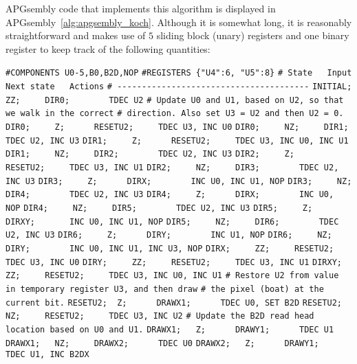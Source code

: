 APGsembly code that implements this algorithm is displayed in APGsembly~\ref{alg:apgsembly_koch}. Although it is somewhat long, it is reasonably straightforward and makes use of $5$ sliding block (unary) registers and one binary register to keep track of the following quantities:\medskip

\begin{apgsembly}
	\centering
	\begin{minipage}[t]{.49\textwidth}
		\begin{algorithmic}\tiny
			\State \verb|#COMPONENTS U0-5,B0,B2D,NOP|
			\State \verb|#REGISTERS {"U4":6, "U5":8}|
			\State \verb|# State   Input   Next state   Actions|
			\State \verb|# ---------------------------------------|
			\State \verb|INITIAL;  ZZ;     DIR0;        TDEC U2|
			\State
			\State \verb|# Update U0 and U1, based on U2, so that we walk in the correct|
			\State \verb|# direction. Also set U3 = U2 and then U2 = 0.|
			\State \verb|DIR0;     Z;      RESETU2;     TDEC U3, INC U0|
			\State \verb|DIR0;     NZ;     DIR1;        TDEC U2, INC U3|
			\State \verb|DIR1;     Z;      RESETU2;     TDEC U3, INC U0, INC U1|
			\State \verb|DIR1;     NZ;     DIR2;        TDEC U2, INC U3|
			\State \verb|DIR2;     Z;      RESETU2;     TDEC U3, INC U1|
			\State \verb|DIR2;     NZ;     DIR3;        TDEC U2, INC U3|
			\State \verb|DIR3;     Z;      DIRX;        INC U0, INC U1, NOP|
			\State \verb|DIR3;     NZ;     DIR4;        TDEC U2, INC U3|
			\State \verb|DIR4;     Z;      DIRX;        INC U0, NOP|
			\State \verb|DIR4;     NZ;     DIR5;        TDEC U2, INC U3|
			\State \verb|DIR5;     Z;      DIRXY;       INC U0, INC U1, NOP|
			\State \verb|DIR5;     NZ;     DIR6;        TDEC U2, INC U3|
			\State \verb|DIR6;     Z;      DIRY;        INC U1, NOP|
			\State \verb|DIR6;     NZ;     DIRY;        INC U0, INC U1, INC U3, NOP|
			\State \verb|DIRX;     ZZ;     RESETU2;     TDEC U3, INC U0|
			\State \verb|DIRY;     ZZ;     RESETU2;     TDEC U3, INC U1|
			\State \verb|DIRXY;    ZZ;     RESETU2;     TDEC U3, INC U0, INC U1|
			\State
			\State \verb|# Restore U2 from value in temporary register U3, and then draw|
			\State \verb|# the pixel (boat) at the current bit.|
			\State \verb|RESETU2;  Z;      DRAWX1;      TDEC U0, SET B2D|
			\State \verb|RESETU2;  NZ;     RESETU2;     TDEC U3, INC U2|
			\State
			\State \verb|# Update the B2D read head location based on U0 and U1.|
			\State \verb|DRAWX1;   Z;      DRAWY1;      TDEC U1|
			\State \verb|DRAWX1;   NZ;     DRAWX2;      TDEC U0|
			\State \verb|DRAWX2;   Z;      DRAWY1;      TDEC U1, INC B2DX|

\end{algorithmic}
\end{minipage}
\end{apgsembly}
